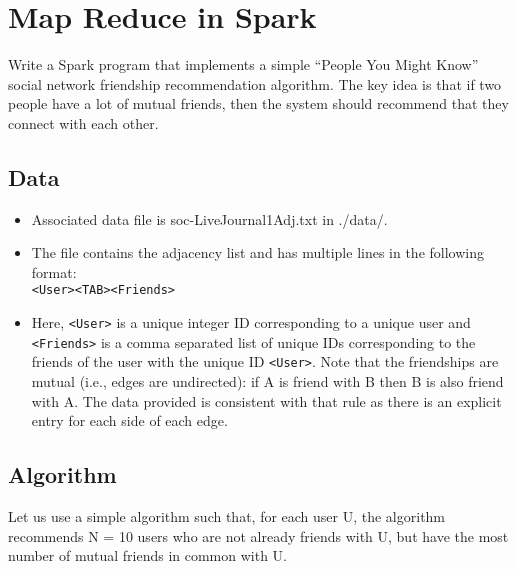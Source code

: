 \documentclass[paper=a4, fontsize=11pt]{scrartcl} %
\begin{document}
\maketitle %

\section{Map Reduce in Spark}

Write a Spark program that implements a simple “People You Might Know” social network friendship recommendation algorithm. The key idea is that if two people have a lot of mutual friends, then the system should recommend that they connect with each other. 

\subsection{Data}



\begin{itemize}
    \item Associated data file is soc-LiveJournal1Adj.txt in ./data/. 
    \item The file contains the adjacency list and has multiple lines in the following format: \\ \verb"<User><TAB><Friends>"
    \item Here, \verb"<User>" is a unique integer ID corresponding to a unique user and \verb"<Friends>" is a comma separated list of unique IDs corresponding to the friends of the user with the unique ID \verb"<User>". Note that the friendships are mutual (i.e., edges are undirected): if A is friend with B then B is also friend with A. The data provided is consistent with that rule as there is an explicit entry for each side of each edge.
\end{itemize}

\subsection{Algorithm}
Let us use a simple algorithm such that, for each user U, the algorithm recommends N = 10 users who are not already friends with U, but have the most number of mutual friends in common with U. 
\end{document}
